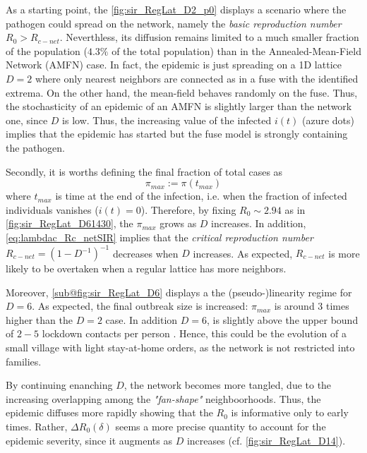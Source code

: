 \documentclass[a4paper,10pt,twoside]{book} %
\theoremstyle{definition}
\begin{document}
As a starting point, the \autoref{fig:sir_RegLat_D2_p0} displays a scenario where the pathogen could spread on the network, namely the \textit{basic reproduction number} $R_0 > R_{c-net}$. Neverthless, its diffusion remains limited to a much smaller fraction of the population ($4.3 \%$ of the total population) than in the Annealed-Mean-Field Network (AMFN) case. In fact, the epidemic is just spreading on a 1D lattice $ D = 2$ where only nearest neighbors are connected as in a fuse with the identified extrema. On the other hand, the mean-field behaves randomly on the fuse. Thus, the stochasticity of an epidemic of an AMFN is slightly larger than the network one, since $ D$ is low. Thus, the increasing value of the infected $i(t)$ (azure dots) implies that the epidemic has started but the fuse model is strongly containing the pathogen. 

Secondly, it is worths defining the final fraction of total cases as
\begin{equation}
	\pi_{max} := \pi(t_{max})
	\label{eq:def_pmax}
\end{equation}
where $ t_{max}$ is time at the end of the infection, i.e. when the fraction of infected individuals vanishes ($i(t) = 0$).
Therefore, by fixing $R_0 \sim 2.94$ as in \autoref{fig:sir_RegLat_D61430}, the $ \pi_{max}$ grows as $D$ increases. In addition, \autoref{eq:lambdac_Rc_netSIR} implies that the
\textit{critical reproduction number} $R_{c-net} = (1-D^{-1})^{-1}$ decreases when $D$ increases. As expected, $R_{c-net}$ is more likely to be overtaken when a regular lattice has more neighbors.

Moreover, \autoref{sub@fig:sir_RegLat_D6} displays a the (pseudo-)linearity regime for $ D = 6$. As expected, the final outbreak size is increased: $ \pi_{max}$ is around $ 3$ times higher than the $ D=2$ case. In addition $D = 6$, is slightly above the upper bound of $2-5$ lockdown contacts per person \cite{Liu::2021_Review_SContactPattern}. Hence, this could be the evolution of a small village with light stay-at-home orders, as the network is not restricted into families.


By continuing enanching $ D$, the network becomes more tangled, due to the increasing overlapping among  the \textit{"fan-shape"} neighboorhoods. Thus, the epidemic diffuses more rapidly showing that the $ R_0$ is informative only to early times. Rather, $\Delta R_0(\delta)$ seems a more precise quantity to account for the epidemic severity, since it augments as $D$ increases (cf. \autoref{fig:sir_RegLat_D14}).
\end{document}
